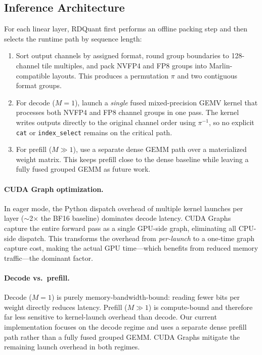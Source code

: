 \documentclass{article}
\begin{document}
\subsection{Inference Architecture}

For each linear layer, RDQuant first performs an offline packing step and then
selects the runtime path by sequence length:
\begin{enumerate}
    \item Sort output channels by assigned format, round group boundaries to 128-channel tile multiples, and pack NVFP4 and FP8 groups into Marlin-compatible layouts. This produces a permutation $\pi$ and two contiguous format groups.
    \item For decode ($M=1$), launch a \emph{single} fused mixed-precision GEMV kernel that processes both NVFP4 and FP8 channel groups in one pass. The kernel writes outputs directly to the original channel order using $\pi^{-1}$, so no explicit \texttt{cat} or \texttt{index\_select} remains on the critical path.
    \item For prefill ($M \gg 1$), use a separate dense GEMM path over a materialized weight matrix. This keeps prefill close to the dense baseline while leaving a fully fused grouped GEMM as future work.
\end{enumerate}

\paragraph{CUDA Graph optimization.}
In eager mode, the Python dispatch overhead of multiple kernel launches per layer ($\sim$2$\times$ the BF16 baseline) dominates decode latency.
CUDA Graphs~\cite{kwon2023vllm} capture the entire forward pass as a single GPU-side graph, eliminating all CPU-side dispatch.
This transforms the overhead from \emph{per-launch} to a one-time graph capture cost, making the actual GPU time---which benefits from reduced memory traffic---the dominant factor.

\paragraph{Decode vs.\ prefill.}
Decode ($M=1$) is purely memory-bandwidth-bound: reading fewer bits per weight directly reduces latency.
Prefill ($M \gg 1$) is compute-bound and therefore far less sensitive to kernel-launch overhead than decode.
Our current implementation focuses on the decode regime and uses a separate dense prefill path rather than a fully fused grouped GEMM.
CUDA Graphs mitigate the remaining launch overhead in both regimes.
\end{document}

